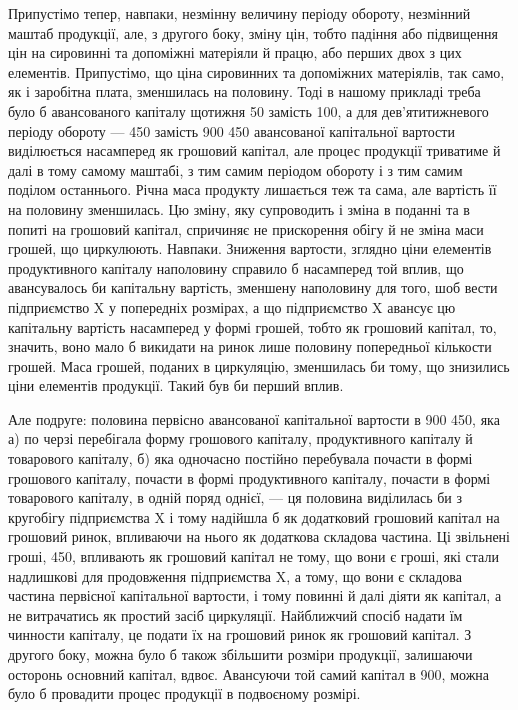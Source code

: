 \parcont{}  %
Припустімо тепер, навпаки, незмінну величину періоду обороту, незмінний
маштаб продукції, але, з другого боку, зміну цін, тобто падіння або
підвищення цін на сировинні та допоміжні матеріяли й працю, або перших
двох з цих елементів. Припустімо, що ціна сировинних та допоміжних
матеріялів, так само, як і заробітна плата, зменшилась на половину.
Тоді в нашому прикладі треба було б авансованого капіталу щотижня
50 замість 100, а для дев'ятитижневого періоду обороту — 450 замість 900 450 авансованої капітальної
вартости виділюється насамперед як грошовий капітал, але процес продукції
триватиме й далі в тому самому маштабі, з тим самим періодом
обороту і з тим самим поділом останнього. Річна маса продукту лишається
теж та сама, але вартість її на половину зменшилась. Цю зміну, яку
супроводить і зміна в поданні та в попиті на грошовий капітал, спричиняє
не прискорення обігу й не зміна маси грошей, що циркулюють. Навпаки.
Зниження вартости, зглядно ціни елементів продуктивного капіталу
наполовину справило б насамперед той вплив, що авансувалось би капітальну
вартість, зменшену наполовину для того, шоб вести підприємство
X у попередніх розмірах, а що підприємство X авансує цю капітальну
вартість насамперед у формі грошей, тобто як грошовий капітал,
то, значить, воно мало б викидати на ринок лише половину попередньої
кількости грошей. Маса грошей, поданих в циркуляцію, зменшилась би
тому, що знизились ціни елементів продукції. Такий був би перший вплив.

Але подруге: половина первісно авансованої капітальної вартости в
900 \deq{} 450, яка а) по черзі перебігала форму грошового
капіталу, продуктивного капіталу й товарового капіталу, б) яка одночасно
постійно перебувала почасти в формі грошового капіталу, почасти
в формі продуктивного капіталу, почасти в формі товарового капіталу,
в одній поряд однієї, — ця половина виділилась би з
кругобігу підприємства X і тому надійшла б як додатковий грошовий
капітал на грошовий ринок, впливаючи на нього як додаткова складова
частина. Ці звільнені гроші, 450, впливають як грошовий капітал
не тому, що вони є гроші, які стали надлишкові для продовження
підприємства X, а тому, що вони є складова частина первісної капітальної
вартости, і тому повинні й далі діяти як капітал, а не витрачатись як
простий засіб циркуляції. Найближчий спосіб надати їм чинности капіталу,
це подати їх на грошовий ринок як грошовий капітал. З другого боку,
можна було б також збільшити розміри продукції, залишаючи осторонь
основний капітал, вдвоє. Авансуючи той самий капітал в 900, можна було б провадити процес продукції в подвоєному розмірі.

